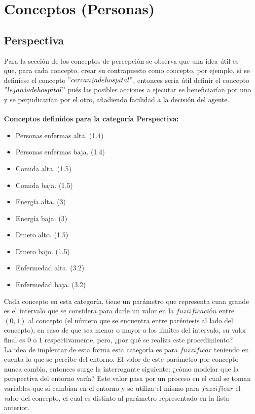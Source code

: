 \section{Conceptos (Personas)}
\subsection{Perspectiva}
Para la sección de los conceptos de percepción se observa que una idea útil es que, para cada concepto, crear su contrapuesto
como concepto, por ejemplo, si se definiese el concepto $"cercan$í$a de hospital"$, entonces sería útil definir el concepto
$"lejan$í$a de hospital"$ pués las posibles acciones a ejecutar se beneficiarían por uno y se perjudicarían por el otro,
añadiendo facilidad a la decisión del agente.\\
\\
\textbf{Conceptos definidos para la categoría Perspectiva:}
\begin{itemize}
    \item Personas enfermas alta. (1.4)
    \item Personas enfermas baja. (1.4)
    \item Comida alta. (1.5)
    \item Comida baja. (1.5)
    \item Energía alta. (3)
    \item Energía baja. (3)
    \item Dinero alto. (1.5)
    \item Dinero bajo. (1.5)
    \item Enfermedad alta. (3.2)
    \item Enfermedad baja. (3.2)
\end{itemize}

Cada concepto en esta categoría, tiene un parámetro que representa cuan grande es el intervalo que se considera para darle un valor en la 
$fuziificaci$ó$n$ entre $(0,1)$ al concepto (el número que se encuentra entre paréntesis al lado del concepto), en caso 
de que sea menor o mayor a los límites del intervalo, su valor final es $0$ o $1$ respectivamente, pero, ¿por qué
se realiza este procedimiento?\\

La idea de implentar de esta forma esta categoría es para $fuzzificar$ teniendo en cuenta lo que se percibe 
del entorno. El valor de este parámetro por concepto nunca cambia, entonces surge la interrogante siguiente: 
¿cómo modelar que la perspectiva del entorno varía? Este valor pasa por un proceso en el cual se toman variables que si
cambian en el entorno y se utiliza el mismo para $fuzzificar$ el valor del concepto, el cual es distinto al parámetro 
representado en la lista anterior.\\

